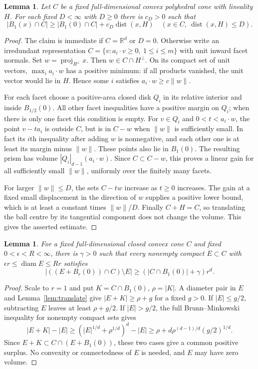 \documentclass[11pt]{article}
\newtheorem{lemma}[theorem]{Lemma}
\theoremstyle{remark}
\newcommand{\R}{\mathbb R}
\newcommand{\dist}{\operatorname{dist}}
\newcommand{\diam}{\operatorname{diam}}
\begin{document}
\begin{lemma}\label{lem:depth}
Let $C$ be a fixed full-dimensional convex polyhedral cone with lineality
$H$. For each fixed $D<\infty$ with $D\geq0$ there is $c_D>0$ such that
\[
 |B_1(x)\cap C|\geq |B_1(0)\cap C|+c_D\dist(x,H)
 \quad(x\in C,\ \dist(x,H)\leq D).
\]
\end{lemma}
\begin{proof}
The claim is immediate if $C=\R^d$ or $D=0$. Otherwise write an irredundant
representation $C=\{v:a_i\cdot v\geq0,\ 1\leq i\leq m\}$ with unit inward
facet normals. Set $w=\operatorname{proj}_{H^\perp}x$. Then
$w\in C\cap H^\perp$. On its compact set of unit vectors,
$\max_i a_i\cdot w$ has a positive minimum: if all products vanished, the
unit vector would lie in $H$. Hence some $i$ satisfies
$a_i\cdot w\geq c\|w\|$.

For each facet choose a positive-area closed disk $Q_i$ in its relative
interior and inside $B_{1/2}(0)$. All other facet inequalities have a positive
margin on $Q_i$; when there is only one facet this condition is empty.
For $v\in Q_i$ and $0<t<a_i\cdot w$, the point $v-t a_i$ is outside $C$,
but is in $C-w$ when $\|w\|$ is sufficiently small. In fact its $i$th
inequality after adding $w$ is nonnegative, and each other one is at least
its margin minus $\|w\|$. These points also lie in $B_1(0)$.
The resulting prism has volume $|Q_i|_{d-1}(a_i\cdot w)$.
Since $C\subset C-w$, this proves a linear gain for all sufficiently small
$\|w\|$, uniformly over the finitely many facets.

For larger $\|w\|\leq D$, the sets $C-tw$ increase as $t\geq0$ increases.
The gain at a fixed small displacement in the direction of $w$ supplies a
positive lower bound, which is at least a constant times $\|w\|/D$.
Finally $C+H=C$, so translating the ball centre by its tangential component
does not change the volume. This gives the asserted estimate.
\end{proof}

\begin{lemma}\label{lem:collar}
For a fixed full-dimensional closed convex cone $C$ and fixed
$0<\epsilon<R<\infty$, there is $\gamma>0$ such that every nonempty compact
$E\subset C$ with $\epsilon r\leq\diam E\leq Rr$ satisfies
\[
 |((E+B_r(0))\cap C)\setminus E|
 \geq (|C\cap B_1(0)|+\gamma)r^d.
\]
\end{lemma}
\begin{proof}
Scale to $r=1$ and put $K=C\cap B_1(0)$, $\rho=|K|$.
A diameter pair in $E$ and Lemma~\ref{lem:translate} give
$|E+K|\geq\rho+g$ for a fixed $g>0$. If $|E|\leq g/2$, subtracting $E$
leaves at least $\rho+g/2$. If $|E|>g/2$, the full Brunn--Minkowski inequality
for nonempty compact sets \cite[Theorem~4.1 and equation~(11)]{Gardner} gives
\[
 |E+K|-|E|\geq
 (|E|^{1/d}+\rho^{1/d})^d-|E|
 \geq\rho+d\rho^{(d-1)/d}(g/2)^{1/d}.
\]
Since $E+K\subset C\cap(E+B_1(0))$, these two cases give a common positive
surplus. No convexity or connectedness of $E$ is needed, and $E$ may have
zero volume.
\end{proof}
\end{document}
